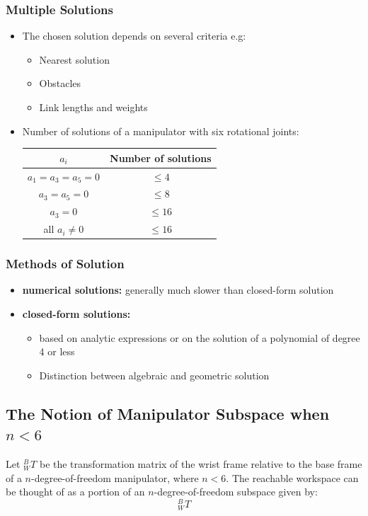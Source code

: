 \documentclass[10pt,a4paper]{article}
\begin{document}
\subsubsection{Multiple Solutions}
\begin{itemize}
	\item The chosen solution depends on several criteria e.g:
	\begin{itemize}
		\item Nearest solution
		\item Obstacles
		\item Link lengths and weights
	\end{itemize}
	\item Number of solutions of a manipulator with six rotational joints: \\
	\begin{tabular}{|c|c|}
		\hline
		$a_i$ & Number of solutions \\
		\hline
		$a_1 = a_3 = a_5 = 0$ & $≤4$ \\
		$a_3 = a_5 = 0$ & $≤8$ \\
		$a_3 = 0$ & $≤16$ \\
		all $a_i ≠ 0$ & $≤16$ \\	
		\hline
	\end{tabular}
	\end{itemize}

\subsubsection{Methods of Solution}
\begin{itemize}
	\item \textbf{numerical solutions:} generally much slower than closed-form solution
	\item \textbf{closed-form solutions:} 
	\begin{itemize}
		\item based on analytic expressions or on the solution of a polynomial of degree 4 or less
		\item Distinction between algebraic and geometric solution
	\end{itemize}
\end{itemize}

\subsection{The Notion of Manipulator Subspace when $n < 6$}
Let $^B_WT$ be the transformation matrix of the wrist frame relative to the base frame of a $n$-degree-of-freedom manipulator, where $n < 6$. The reachable workspace can be thought of as a portion of an $n$-degree-of-freedom subspace given by: \\
$$
	^B_WT
$$
\end{document}
